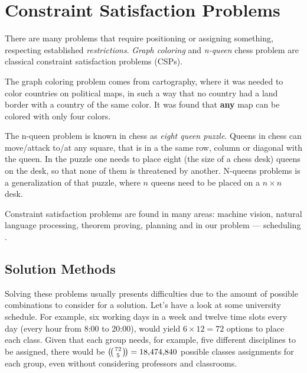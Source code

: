\documentclass[header]{subfiles}
\begin{document}
\chapter{Constraint Satisfaction Problems}
\label{chapter:csp}

There are many problems that require positioning or assigning something,
respecting established \emph{restrictions}. \emph{Graph coloring} and
\emph{n-queen} chess problem are classical constraint satisfaction problems (CSPs).


The graph coloring problem comes from cartography, where it was needed to color
countries on political maps, in such a way that no country had a land border with
a country of the same color. It was found that \textbf{any} map can be colored
with only four colors.

The n-queen problem is known in chess as \emph{eight queen puzzle}.
Queens in chess can move/attack to/at any square,
that is in a the same row, column or diagonal with the queen.
In the puzzle one needs to place eight (the size of a chess desk)
queens on the desk, so that none of them is threatened by another.
N-queens problems is a generalization of that puzzle, where $n$ queens need
to be placed on a $n \times n$ desk.

Constraint satisfaction problems are found in many areas:
machine vision, natural language processing, theorem proving,
planning and in our problem --- scheduling \cite{MAS}.



\section{Solution Methods}
\label{sec:CSP-solution-methods}
  Solving these problems usually presents difficulties due to the amount of
possible combinations to consider for a solution. Let's have a look at
some university schedule.
  For example, six working days in a week and twelve time slots every day
(every hour from 8:00 to 20:00), would yield $6 \times 12 = 72$ options
to place each class.
  Given that each group needs, for example, five different disciplines to be assigned,
there would be $\multibinom{72}{5} = \num[group-separator={,}]{18474840}$
possible classes assignments for each group,
even without considering professors and classrooms.
\end{document}
